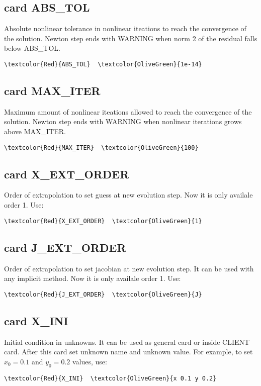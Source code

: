 \subsection{card ABS_TOL}
Absolute nonlinear tolerance in nonlinear iteations to reach the convergence of the solution. Newton step ends with WARNING when norm 2 of the residual falls below ABS_TOL.
\begin{Verbatim}[frame=single,commandchars=\\\{\}]
\textcolor{Red}{ABS_TOL}  \textcolor{OliveGreen}{1e-14}
\end{Verbatim}

\subsection{card MAX_ITER}
Maximum amount of nonlinear iteations allowed to reach the convergence of the solution. Newton step ends with WARNING when nonlinear iterations grows above MAX_ITER.
\begin{Verbatim}[frame=single,commandchars=\\\{\}]
\textcolor{Red}{MAX_ITER}  \textcolor{OliveGreen}{100}
\end{Verbatim}

\subsection{card X_EXT_ORDER}
Order of extrapolation to set guess at new evolution step. Now it is only availale order 1. Use:
\begin{Verbatim}[frame=single,commandchars=\\\{\}]
\textcolor{Red}{X_EXT_ORDER}  \textcolor{OliveGreen}{1}
\end{Verbatim}

\subsection{card J_EXT_ORDER}
Order of extrapolation to set jacobian at new evolution step. It can be used with any implicit method. Now it is only availale order 1. Use:
\begin{Verbatim}[frame=single,commandchars=\\\{\}]
\textcolor{Red}{J_EXT_ORDER}  \textcolor{OliveGreen}{J}
\end{Verbatim}


\subsection{card X_INI}
Initial condition in unknowns. It can be used as general card or inside CLIENT card. After this card set unknown name and unknown value. For example, to set $x_0=0.1$ and $y_0=0.2$ values, use:
\begin{Verbatim}[frame=single,commandchars=\\\{\}]
\textcolor{Red}{X_INI}  \textcolor{OliveGreen}{x 0.1 y 0.2}
\end{Verbatim}

